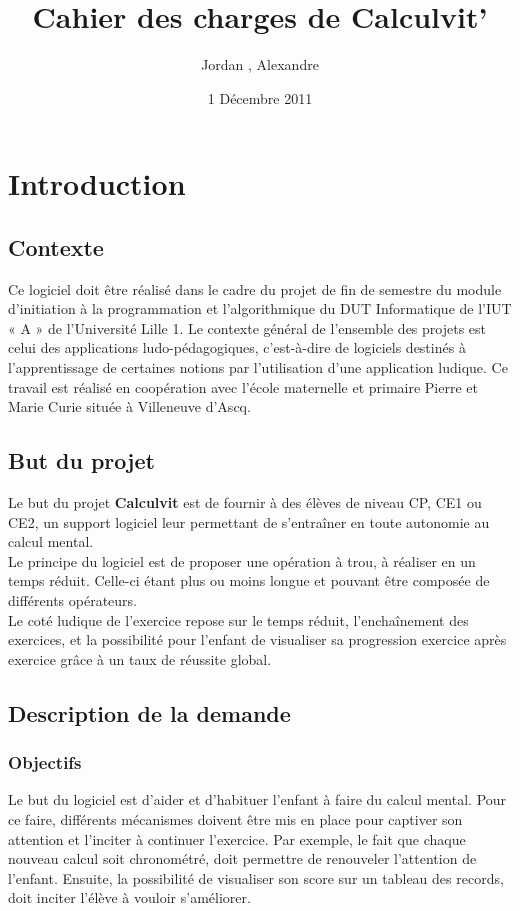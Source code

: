 \documentclass[a4paper,11pt]{report} %
\title{Cahier des charges de Calculvit'}
\author{Jordan \bsc{Piorun}, Alexandre \bsc{Rupp}}
\date{1 Décembre 2011}
\begin{document}
\maketitle
\tableofcontents

\chapter{Introduction}
\section{Contexte}
Ce logiciel doit être réalisé dans le cadre du projet de fin de semestre du module d'initiation à la
programmation et l'algorithmique du DUT Informatique de l'IUT « A » de l'Université Lille 1. Le
contexte général de l'ensemble des projets est celui des applications ludo-pédagogiques, c'est-à-dire
de logiciels destinés à l'apprentissage de certaines notions par l'utilisation d'une application ludique.
Ce travail est réalisé en coopération avec l'école maternelle et primaire Pierre et Marie Curie située
à Villeneuve d'Ascq.


\section{But du projet}

Le but du projet \textbf{Calculvit} est de fournir à des élèves de niveau CP, CE1 ou CE2, un support logiciel leur permettant de s’entraîner en toute autonomie au calcul mental.\\
Le principe du logiciel est de proposer une opération à trou, à réaliser en un temps réduit. Celle-ci étant plus ou moins longue et pouvant être composée de différents opérateurs.\\
Le coté ludique de l'exercice repose sur le temps réduit, l’enchaînement des exercices, et la possibilité pour l'enfant de visualiser sa progression exercice après exercice grâce à un taux de réussite global. 

\section{Description de la demande}
\subsection{Objectifs}
Le but du logiciel est d'aider et d'habituer l'enfant à faire du calcul mental. Pour ce faire, différents mécanismes doivent être mis en place pour captiver son attention et l'inciter à continuer l'exercice. Par exemple, le fait que chaque nouveau calcul soit chronométré, doit permettre de renouveler l'attention de l'enfant. Ensuite, la possibilité de visualiser son score sur un tableau des records, doit inciter l'élève à vouloir s'améliorer.
\end{document}
